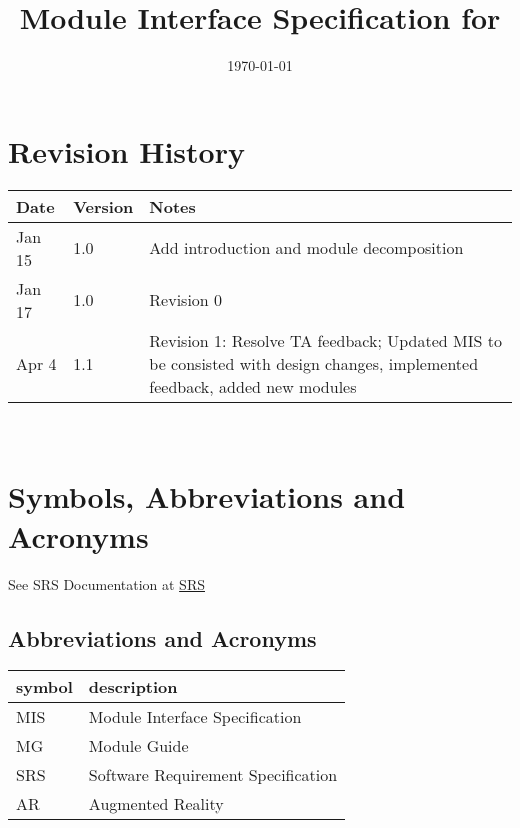 \documentclass[12pt, titlepage]{article}
\begin{document}
\title{Module Interface Specification for \progname{}}

\author{\authname}

\date{\today}

\maketitle


\section{Revision History}

\begin{tabularx}{\textwidth}{p{3cm}p{2cm}X}
\toprule {\bf Date} & {\bf Version} & {\bf Notes}\\
\midrule
Jan 15 & 1.0 & Add introduction and module decomposition\\
Jan 17 & 1.0 & Revision 0\\
Apr 4  & 1.1 & Revision 1: Resolve TA feedback; Updated MIS to be consisted with design changes, implemented feedback, added new modules\\

\bottomrule
\end{tabularx}

~\newpage

\section{Symbols, Abbreviations and Acronyms}

See SRS Documentation at \href{https://github.com/beatlepie/4G06CapstoneProjectTeam2/blob/main/docs/SRS-Volere/SRS.pdf}{SRS}
\subsection{Abbreviations and Acronyms}

\renewcommand{\arraystretch}{1.2}
\begin{tabular}{l l} 
  \toprule		
  \textbf{symbol} & \textbf{description}\\
  \midrule 
  MIS & Module Interface Specification \\
  MG & Module Guide \\
  SRS & Software Requirement Specification\\
  AR & Augmented Reality\\
  \bottomrule
\end{tabular}\\
\end{document}
